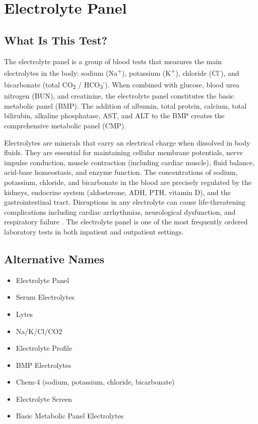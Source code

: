 \chapter{Electrolyte Panel}

\section*{What Is This Test?}
The electrolyte panel is a group of blood tests that measures the main electrolytes in the body: sodium (Na\textsuperscript{+}), potassium (K\textsuperscript{+}), chloride (Cl\textsuperscript{-}), and bicarbonate (total CO\textsubscript{2} / HCO\textsubscript{3}\textsuperscript{-}). When combined with glucose, blood urea nitrogen (BUN), and creatinine, the electrolyte panel constitutes the basic metabolic panel (BMP). The addition of albumin, total protein, calcium, total bilirubin, alkaline phosphatase, AST, and ALT to the BMP creates the comprehensive metabolic panel (CMP).

Electrolytes are minerals that carry an electrical charge when dissolved in body fluids. They are essential for maintaining cellular membrane potentials, nerve impulse conduction, muscle contraction (including cardiac muscle), fluid balance, acid-base homeostasis, and enzyme function. The concentrations of sodium, potassium, chloride, and bicarbonate in the blood are precisely regulated by the kidneys, endocrine system (aldosterone, ADH, PTH, vitamin D), and the gastrointestinal tract. Disruptions in any electrolyte can cause life-threatening complications including cardiac arrhythmias, neurological dysfunction, and respiratory failure \cite{seifter2014integration}. The electrolyte panel is one of the most frequently ordered laboratory tests in both inpatient and outpatient settings.

\section*{Alternative Names}
\begin{itemize}
  \item Electrolyte Panel
  \item Serum Electrolytes
  \item Lytes
  \item Na/K/Cl/CO2
  \item Electrolyte Profile
  \item BMP Electrolytes
  \item Chem-4 (sodium, potassium, chloride, bicarbonate)
  \item Electrolyte Screen
  \item Basic Metabolic Panel Electrolytes
\end{itemize}
